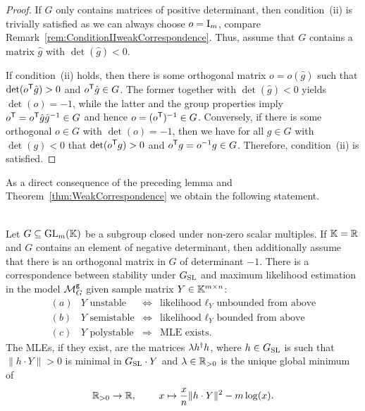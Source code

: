 \begin{proof}
	If $G$ only contains matrices of positive determinant, then condition~(ii) is trivially satisfied as we can always choose $o = \operatorname{I}_m$, compare Remark~\ref{rem:ConditionIIweakCorrespondence}. Thus, assume that $G$ contains a matrix $\hat{g}$ with $\det(\hat{g}) < 0$.
	
	If condition~(ii) holds, then there is some orthogonal matrix $o = o(\hat{g})$ such that $\det(o^{\mathsf{T}} \hat{g}) > 0$ and $o^{\mathsf{T}} \hat{g} \in G$. The former together with $\det(\hat{g}) < 0$ yields $\det(o) = -1$, while the latter and the group properties imply $o^{\mathsf{T}} = o^{\mathsf{T}} \hat{g} \hat{g}^{-1} \in G$ and hence $o = (o^{\mathsf{T}})^{-1} \in G$. 
	Conversely, if there is some orthogonal $o \in G$ with $\det(o) = -1$, then we have for all $g \in G$ with $\det(g) < 0$ that $\det(o^{\mathsf{T}} g) > 0$ and $o^{\mathsf{T}} g = o^{-1} g \in G$. Therefore, condition~(ii) is satisfied.
\end{proof}

As a direct consequence of the preceding lemma and Theorem~\ref{thm:WeakCorrespondence} we obtain the following statement.

\begin{theorem}\label{thm:GroupWeakCorrespondence}
	\ \\
	Let $G \subseteq \operatorname{GL}_m(\mathbb K)$ be a subgroup closed under non-zero scalar multiples. If $\mathbb K = \mathbb R$ and $G$ contains an element of negative determinant, then additionally assume that there is an orthogonal matrix in $G$ of determinant $-1$.
	There is a correspondence between stability under $G_{\operatorname{SL}}$ and maximum likelihood estimation in the model $\mathcal{M}^{\mathtt{g}}_G$ given sample matrix $Y \in \mathbb K^{m \times n}$: 
	$$ \begin{matrix} (a) & Y \text{ unstable}  & \Leftrightarrow & \text{likelihood $\ell_Y$ unbounded from above} \\ 
		(b) &  Y \text{ semistable} & \Leftrightarrow & \text{likelihood $\ell_Y$ bounded from above} \\ 
		(c) & Y \text{ polystable}  & \Rightarrow & \text{MLE exists.} \end{matrix} $$
	The MLEs, if they exist, are the matrices $\lambda h^{\dagger} h$, where $h \in G_{\operatorname{SL}}$ is such that $\| h \cdot Y\| > 0$ is minimal in $G_{\operatorname{SL}} \cdot Y$ and $\lambda \in \mathbb R_{>0}$ is the unique global minimum of
	\[\mathbb R_{>0} \to \mathbb R, \qquad \; x \mapsto \frac{x}{n} \|h \cdot Y\|^2 - m\log(x).\]
\end{theorem}

